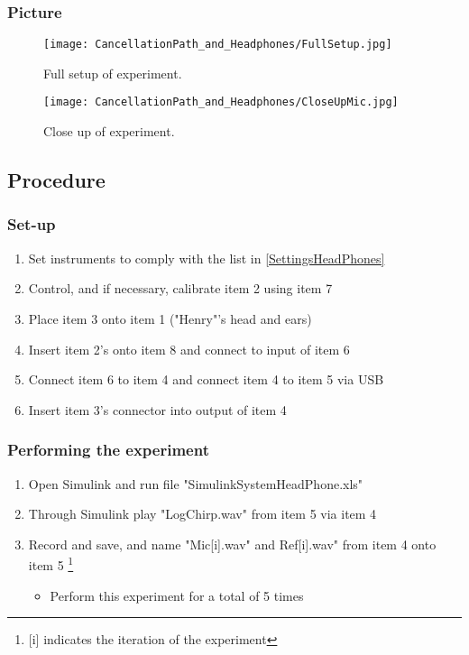 \subsubsection{Picture}
\begin{figure}[H]
	\centering
	\texttt{[image: CancellationPath\_and\_Headphones/FullSetup.jpg]}
	\caption{Full setup of experiment.}
	\label{FullSetupCancellationPath}
\end{figure}

\begin{figure}[H]
	\centering
	\texttt{[image: CancellationPath\_and\_Headphones/CloseUpMic.jpg]}
	\caption{Close up of experiment.}
	\label{CloseUpCancellationPath}
\end{figure}

\subsection{Procedure}
\subsubsection{Set-up}
\begin{enumerate}
	\item Set instruments to comply with the list in \ref{SettingsHeadPhones}
	\item Control, and if necessary, calibrate item 2 using item 7
	\item Place item 3 onto item 1 ("Henry"'s head and ears)
	\item Insert item 2's onto item 8 and connect to input of item 6
	\item Connect item 6 to item 4 and connect item 4 to item 5 via USB
	\item Insert item 3's connector into output of item 4
\end{enumerate}

\subsubsection{Performing the experiment}
\begin{enumerate}
	\item Open Simulink\textsuperscript{\textregistered} and run file "SimulinkSystemHeadPhone.xls"
	\item Through Simulink\textsuperscript{\textregistered} play "LogChirp.wav" from item 5 via item 4
	\item Record and save, and name "Mic[i].wav" and Ref[i].wav" from item 4 onto item 5 \footnote{[i] indicates the iteration of the experiment}
	\begin{itemize}
		\item[] Perform this experiment for a total of 5 times
	\end{itemize}
\end{enumerate}


